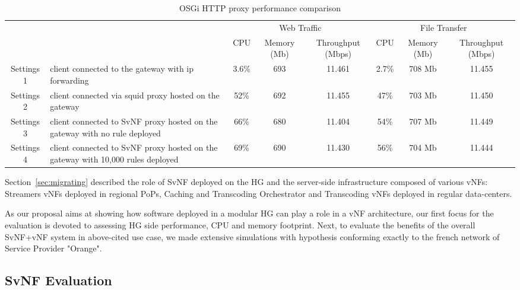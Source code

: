 \begin{table}
	\centering
	\begin{tabular}{| c | p{}|c |c |c || c |c |c |}
	
	
 	    \multicolumn{2}{c}{} & \multicolumn{3}{c}{Web Traffic} 		  & \multicolumn{3}{c}{File Transfer} \\
 	     \cline{3-8}	
             \multicolumn{2}{c|}{} & CPU 			& Memory (Mb) 		& Throughput (Mbps)	& CPU 		& Memory (Mb)		& Throughput (Mbps) \\\hline   
Settings 1 & client connected to the gateway with ip forwarding &   3.6\% 		& 693 		& 11.461		& 2.7\%		& 708 Mb		& 11.455 \\\hline
Settings 2 & client connected via squid proxy hosted on the gateway   &   52\%        & 692 		& 11.455		& 47\%		& 703 Mb		& 11.450 \\\hline
Settings 3 & client connected to SvNF proxy hosted on the gateway with no rule deployed &   66\%		& 680 		& 11.404		& 54\%		& 707 Mb		& 11.449 \\\hline
Settings 4 & client connected to SvNF proxy hosted on the gateway with 10,000 rules deployed   &   69\%        & 690 		& 11.430		& 56\%		& 704 Mb		& 11.444 \\\hline
	
	            
	\end{tabular}
	\caption{
	OSGi HTTP proxy performance comparison
	\label{tab:perf-comparison}
	}
	
\end{table}

Section~\ref{sec:migrating} described the role of SvNF deployed on the HG and the server-side infrastructure composed of various vNFs: Streamers vNFs deployed in regional PoPs, Caching and Transcoding Orchestrator and Transcoding vNFs deployed in regular data-centers. 

As our proposal aims at showing how software deployed in a modular HG can play a role in a vNF architecture, our first focus for the evaluation is devoted to assessing HG side performance, CPU and memory footprint.
Next, to evaluate the benefits of the overall SvNF+vNF system in above-cited use case, we made extensive simulations with hypothesis conforming exactly to the french network of Service Provider "Orange".

\subsection{SvNF Evaluation }\label{Testbed}

